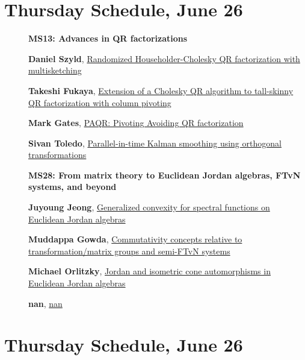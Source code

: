 \documentclass[ILAS2025-program.tex]{subfiles}
\begin{document}
\section*{Thursday Schedule, June 26 }
        
        \begin{description}
    \item[] {\color{mstitle}\textbf{MS13: Advances in QR factorizations}} 
    \item[] \hypertarget{up0339}{}\textbf{Daniel Szyld}, \hyperlink{down0339}{Randomized Householder-Cholesky QR factorization with multisketching}
        \item[] \hypertarget{up0340}{}\textbf{Takeshi Fukaya}, \hyperlink{down0340}{Extension of a Cholesky QR algorithm to tall-skinny QR factorization with column pivoting
}
        \item[] \hypertarget{up0341}{}\textbf{Mark Gates}, \hyperlink{down0341}{PAQR: Pivoting Avoiding QR factorization}
        \item[] \hypertarget{up0342}{}\textbf{Sivan Toledo}, \hyperlink{down0342}{Parallel-in-time Kalman smoothing using orthogonal transformations
}
        \end{description}
    \begin{description}
    \item[] {\color{mstitle}\textbf{MS28: From matrix theory to Euclidean Jordan algebras, FTvN systems, and beyond}} 
    \item[] \hypertarget{up0383}{}\textbf{Juyoung Jeong}, \hyperlink{down0383}{Generalized convexity for spectral functions on Euclidean Jordan algebras
}
        \item[] \hypertarget{up0384}{}\textbf{Muddappa Gowda}, \hyperlink{down0384}{Commutativity concepts relative to transformation/matrix groups and semi-FTvN systems}
        \item[] \hypertarget{up0385}{}\textbf{Michael Orlitzky}, \hyperlink{down0385}{Jordan and isometric cone automorphisms in Euclidean Jordan algebras}
        \item[] \hypertarget{up0386}{}\textbf{nan}, \hyperlink{down0386}{nan}
        \end{description}
    \newpage

\section*{Thursday Schedule, June 26 }
        
\end{document}
